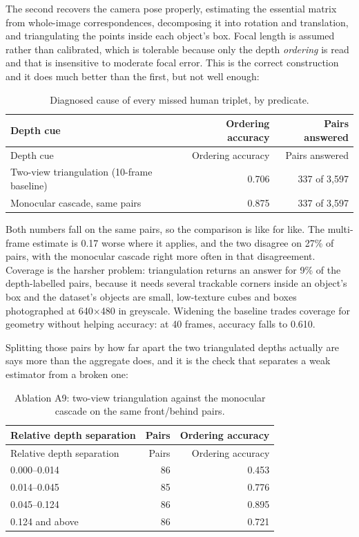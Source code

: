 The second recovers the camera pose properly, estimating the essential matrix from whole-image correspondences, decomposing it into rotation and translation, and triangulating the points inside each object's box. Focal length is assumed rather than calibrated, which is tolerable because only the depth \textit{ordering} is read and that is insensitive to moderate focal error. This is the correct construction and it does much better than the first, but not well enough:

\begin{center}
\small
\begin{longtable}{lrr}
\caption{Diagnosed cause of every missed human triplet, by predicate.}\\
\hline
Depth cue & Ordering accuracy & Pairs answered \\
\hline
\endfirsthead
\hline
Depth cue & Ordering accuracy & Pairs answered \\
\hline
\endhead
Two-view triangulation (10-frame baseline) & 0.706 & 337 of 3,597 \\
Monocular cascade, same pairs & 0.875 & 337 of 3,597 \\
\hline
\end{longtable}
\end{center}

Both numbers fall on the same pairs, so the comparison is like for like. The multi-frame estimate is 0.17 worse where it applies, and the two disagree on 27\% of pairs, with the monocular cascade right more often in that disagreement. Coverage is the harsher problem: triangulation returns an answer for 9\% of the depth-labelled pairs, because it needs several trackable corners inside an object's box and the dataset's objects are small, low-texture cubes and boxes photographed at 640$\times$480 in greyscale. Widening the baseline trades coverage for geometry without helping accuracy: at 40 frames, accuracy falls to 0.610.

Splitting those pairs by how far apart the two triangulated depths actually are says more than the aggregate does, and it is the check that separates a weak estimator from a broken one:

\begin{center}
\small
\begin{longtable}{lrr}
\caption{Ablation A9: two-view triangulation against the monocular cascade on the same front/behind pairs.}\\
\hline
Relative depth separation & Pairs & Ordering accuracy \\
\hline
\endfirsthead
\hline
Relative depth separation & Pairs & Ordering accuracy \\
\hline
\endhead
0.000--0.014 & 86 & 0.453 \\
0.014--0.045 & 85 & 0.776 \\
0.045--0.124 & 86 & 0.895 \\
0.124 and above & 86 & 0.721 \\
\hline
\end{longtable}
\end{center}

